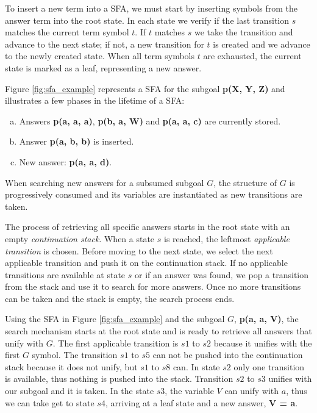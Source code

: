   To insert a new term into a SFA, we must start by inserting symbols from the answer term into the root state.
  In each state we verify if the last transition $s$ matches the current term symbol $t$. If $t$ matches $s$
  we take the transition and advance to the next state; if not, a new transition for $t$ is created and we advance
  to the newly created state. When all term symbols $t$ are exhausted, the current state is marked as a leaf,
  representing a new answer.
  
  Figure \ref{fig:sfa_example} represents a SFA for the subgoal \textbf{p(X, Y, Z)} and
  illustrates a few phases in the lifetime of a SFA:
  
  \begin{enumerate}[(a)]
    \item Answers \textbf{p(a, a, a)}, \textbf{p(b, a, W)} and \textbf{p(a, a, c)} are currently stored.
    \item Answer \textbf{p(a, b, b)} is inserted.
    \item New answer: \textbf{p(a, a, d)}.
  \end{enumerate}
  
  When searching new answers for a subsumed subgoal $G$, the structure of $G$ is progressively consumed and its variables
  are instantiated as new transitions are taken.
  
  The process of retrieving all specific answers starts in the root state with an empty \textit{continuation stack}.
  When a state $s$ is reached, the leftmost \textit{applicable transition} is chosen. Before moving to the next state,
  we select the next applicable transition and push it on the continuation stack.
  If no applicable transitions are available at state $s$ or if an answer was found, we pop a transition from
  the stack and use it to search for more answers. Once no more transitions can be taken and the stack is empty, the
  search process ends.
  
  Using the SFA in Figure \ref{fig:sfa_example} and the subgoal $G$, \textbf{p(a, a, V)}, the search mechanism starts
  at the root state and is ready to retrieve all answers that unify with $G$.
  The first applicable transition is $s1$ to $s2$ because it unifies with the first $G$ symbol. The transition
  $s1$ to $s5$ can not be pushed into the continuation stack because it does not unify, but $s1$ to $s8$ can.
  In state $s2$ only one transition is available, thus nothing is pushed into the stack.
  Transition $s2$ to $s3$ unifies with our subgoal and it is taken. In the state $s3$, the variable $V$ can unify with $a$,
  thus we can take get to state $s4$, arriving at a leaf state and a new answer, \textbf{V = a}.
  
